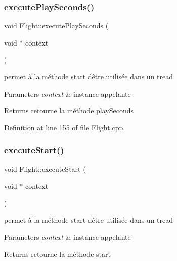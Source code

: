 \subsubsection{\texorpdfstring{execute\+Play\+Seconds()}{executePlaySeconds()}}
{\footnotesize\ttfamily void Flight\+::execute\+Play\+Seconds (\begin{DoxyParamCaption}\item[{void $\ast$}]{context }\end{DoxyParamCaption})\hspace{0.3cm}{\ttfamily [static]}}



permet à la méthode start d\textquotesingle{}être utilisée dans un tread 


\begin{DoxyParams}{Parameters}
{\em context} & instance appelante \\
\hline
\end{DoxyParams}
\begin{DoxyReturn}{Returns}
retourne la méthode play\+Seconds 
\end{DoxyReturn}


Definition at line 155 of file Flight.\+cpp.

\mbox{\label{class_flight_a2cb1c243edbdb53858e2b97ebbe96cf6}} 
\subsubsection{\texorpdfstring{execute\+Start()}{executeStart()}}
{\footnotesize\ttfamily void Flight\+::execute\+Start (\begin{DoxyParamCaption}\item[{void $\ast$}]{context }\end{DoxyParamCaption})\hspace{0.3cm}{\ttfamily [static]}}



permet à la méthode start d\textquotesingle{}être utilisée dans un tread 


\begin{DoxyParams}{Parameters}
{\em context} & instance appelante \\
\hline
\end{DoxyParams}
\begin{DoxyReturn}{Returns}
retourne la méthode start 
\end{DoxyReturn}


